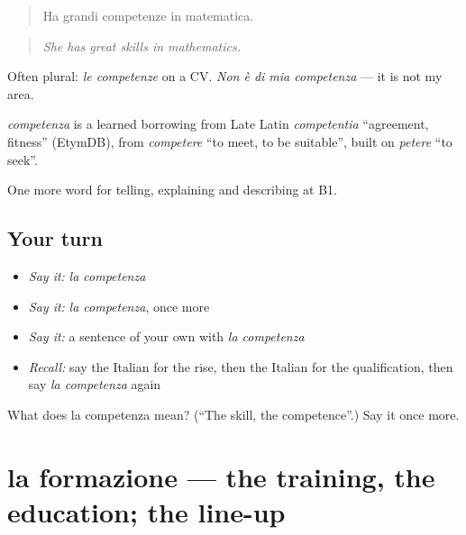 \begin{quote}
Ha grandi competenze in matematica.
\end{quote}

\begin{quote}
\emph{She has great skills in mathematics.}
\end{quote}

Often plural: \emph{le competenze} on a CV. \emph{Non è di mia competenza} — it is not my area.

\begin{cousinweb}
\emph{competenza} is a learned borrowing from Late Latin \emph{competentia} \textquotedblleft{}agreement, fitness\textquotedblright{} (EtymDB), from \emph{competere} \textquotedblleft{}to meet, to be suitable\textquotedblright{}, built on \emph{petere} \textquotedblleft{}to seek\textquotedblright{}.
\end{cousinweb}

\begin{grammarlens}[title={What you've built}]
One more word for telling, explaining and describing at B1.
\end{grammarlens}

\subsection*{Your turn}
\begin{itemize}
\raggedright
  \item \emph{Say it:} \emph{la competenza}
  \item \emph{Say it:} \emph{la competenza}, once more
  \item \emph{Say it:} a sentence of your own with \emph{la competenza}
  \item \emph{Recall:} say the Italian for the rise, then the Italian for the qualification, then say \emph{la competenza} again
\end{itemize}

\begin{tcolorbox}[breakable,colback=teal!4,colframe=teal!35!black,title={Before you move on}]
What does la competenza mean? (\textquotedblleft{}The skill, the competence\textquotedblright{}.) Say it once more.
\end{tcolorbox}
\section[la formazione]{la formazione — the training, the education; the line-up}

